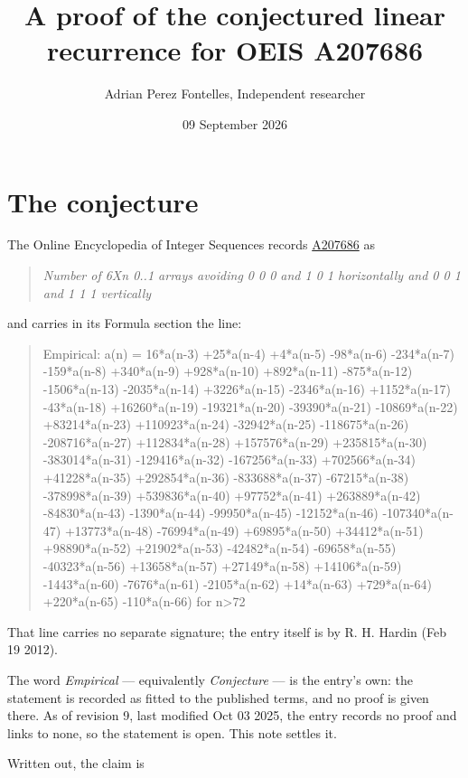 \documentclass[11pt]{article}
\title{A proof of the conjectured linear recurrence for OEIS A207686}
\author{Adrian Perez Fontelles, Independent researcher}
\date{09 September 2026}
\theoremstyle{definition}
\begin{document}
\maketitle
\section{The conjecture}

The Online Encyclopedia of Integer Sequences records \href{https://oeis.org/A207686}{A207686} as

\begin{quote}\itshape Number of 6Xn 0..1 arrays avoiding 0 0 0 and 1 0 1 horizontally and 0 0 1 and 1 1 1 vertically\end{quote}

and carries in its Formula section the line:

\begin{quote}\ttfamily Empirical: a(n) = 16*a(n-3) +25*a(n-4) +4*a(n-5) -98*a(n-6) -234*a(n-7) -159*a(n-8) +340*a(n-9) +928*a(n-10) +892*a(n-11) -875*a(n-12) -1506*a(n-13) -2035*a(n-14) +3226*a(n-15) -2346*a(n-16) +1152*a(n-17) -43*a(n-18) +16260*a(n-19) -19321*a(n-20) -39390*a(n-21) -10869*a(n-22) +83214*a(n-23) +110923*a(n-24) -32942*a(n-25) -118675*a(n-26) -208716*a(n-27) +112834*a(n-28) +157576*a(n-29) +235815*a(n-30) -383014*a(n-31) -129416*a(n-32) -167256*a(n-33) +702566*a(n-34) +41228*a(n-35) +292854*a(n-36) -833688*a(n-37) -67215*a(n-38) -378998*a(n-39) +539836*a(n-40) +97752*a(n-41) +263889*a(n-42) -84830*a(n-43) -1390*a(n-44) -99950*a(n-45) -12152*a(n-46) -107340*a(n-47) +13773*a(n-48) -76994*a(n-49) +69895*a(n-50) +34412*a(n-51) +98890*a(n-52) +21902*a(n-53) -42482*a(n-54) -69658*a(n-55) -40323*a(n-56) +13658*a(n-57) +27149*a(n-58) +14106*a(n-59) -1443*a(n-60) -7676*a(n-61) -2105*a(n-62) +14*a(n-63) +729*a(n-64) +220*a(n-65) -110*a(n-66) for n>72\end{quote}

That line carries no separate signature; the entry itself is by R. H. Hardin (Feb 19 2012).

The word {\itshape Empirical} --- equivalently {\itshape Conjecture} --- is the entry's own: the statement is recorded as fitted to the published terms, and no proof is given there. As of revision 9, last modified Oct 03 2025, the entry records no proof and links to none, so the statement is open. This note settles it.

Written out, the claim is
\end{document}
